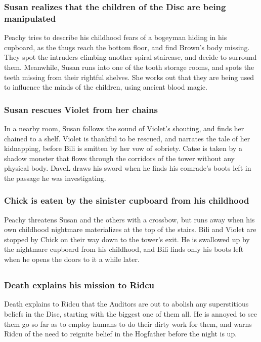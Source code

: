 \subsubsection{\Gls{Susan} realizes that the children of the Disc are being manipulated}
\Gls{Peachy} tries to describe his childhood fears of a bogeyman hiding in his cupboard, as the
thugs reach the bottom floor, and find \Gls{Brown}'s body missing. They spot the intruders climbing
another spiral staircase, and decide to surround them. Meanwhile, \Gls{Susan} runs into one of the
tooth storage rooms, and spots the teeth missing from their rightful shelves. She works out that
they are being used to influence the minds of the children, using ancient blood magic.

\subsubsection{\Gls{Susan} rescues \Gls{Violet} from her chains}
In a nearby room, \Gls{Susan} follows the sound of \Gls{Violet}'s shouting, and finds her chained
to a shelf. \Gls{Violet} is thankful to be rescued, and narrates the tale of her kidnapping, before
\Gls{Bili} is smitten by her vow of sobriety. \Gls{Catse} is taken by a shadow monster that flows
through the corridors of the tower without any physical body. \Gls{DaveL} draws his sword when he
finds his comrade's boots left in the passage he was investigating.

\subsubsection{\Gls{Chick} is eaten by the sinister cupboard from his childhood}
\Gls{Peachy} threatens \Gls{Susan} and the others with a crossbow, but runs away when his own
childhood nightmare materializes at the top of the stairs. \Gls{Bili} and \Gls{Violet} are stopped
by \Gls{Chick} on their way down to the tower's exit. He is swallowed up by the nightmare cupboard
from his childhood, and \Gls{Bili} finds only his boots left when he opens the doors to it a while
later.

\subsection{}
\subsubsection{\Gls{Death} explains his mission to \Gls{Ridcu}}
\Gls{Death} explains to \Gls{Ridcu} that the Auditors are out to abolish any superstitious beliefs
in the Disc, starting with the biggest one of them all. He is annoyed to see them go so far as to
employ humans to do their dirty work for them, and warns \Gls{Ridcu} of the need to reignite belief
in the Hogfather before the night is up.

